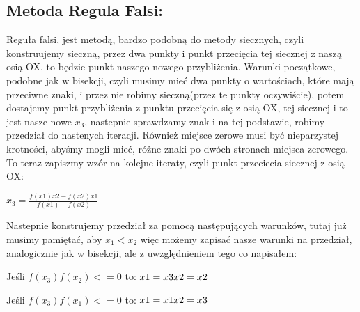 \documentclass[12pt]{article}
\begin{document}
\subsection{Metoda Regula Falsi:}
Reguła falsi, jest metodą, bardzo podobną do metody siecznych, czyli konstruujemy sieczną, przez dwa punkty i punkt przecięcia tej siecznej z naszą osią OX, to będzie punkt naszego nowego przybliżenia. Warunki początkowe, podobne jak w bisekcji, czyli musimy mieć dwa punkty o wartościach, które mają przeciwne znaki, i przez nie robimy sieczną(przez te punkty oczywiście), potem dostajemy punkt przybliżenia z punktu przecięcia się z osią OX, tej siecznej i to jest nasze nowe $x_{3}$, nastepnie sprawdzamy znak i na tej podstawie, robimy przedział do nastenych iteracji. Również miejsce zerowe musi być nieparzystej krotności, abyśmy mogli mieć, różne znaki po dwóch stronach miejsca zerowego. To teraz zapiszmy wzór na kolejne iteraty, czyli punkt przeciecia siecznej z osią OX:
\begin{center}
    \begin{math}
        x_{3} = \frac{f(x1)x2 - f(x2)x1}{f(x1) - f(x2)}
    \end{math}
\end{center}
Nastepnie konstrujemy przedział za pomocą następujących warunków, tutaj już musimy pamiętać, aby $x_{1}<x_{2}$ więc możemy zapisać nasze warunki na przedział, analogicznie jak w bisekcji, ale z uwzględnieniem tego co napisałem:
\begin{center}
    Jeśli $f(x_{3})f(x_{2})<=0$ to: \newline
    \begin{math}
        x1 = x3\newline
        x2 = x2
    \end{math}
\end{center}
\begin{center}
    Jeśli $f(x_{3})f(x_{1})<=0$ to: \newline
    \begin{math}
        x1 = x1\newline
        x2 = x3
    \end{math}
\end{center}
\end{document}

